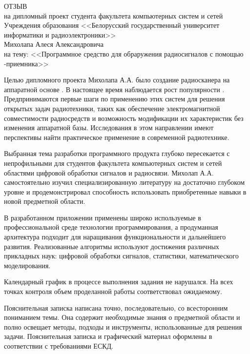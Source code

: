 \thispagestyle{empty}

\begin{singlespace}

{\small
  \begin{center}
    \begin{minipage}{0.8\textwidth}
      \begin{center}
        {\normalsize ОТЗЫВ}\\[1em]
        на дипломный проект студента факультета компьютерных систем и сетей 
        Учреждения образования <<Белорусский государственный университет информатики и радиоэлектроники>>\\
        Михолапа Алеся Александровича \\
        на тему: <<Программное средство для обраружения радиосигналов с помощью \SDR-приемника>>
      \end{center}
    \end{minipage}
  \end{center}

Целью дипломного проекта Михолапа А.А. было создание радиосканера на аппаратной основе \sdr.
В настоящее время наблюдается рост популярности \SDR. Предпринимаются первые шаги по применению этих систем для решения открытых задач радиотехники, таких как обеспечение электромагнитной совместимости радиосредств и возможность модификации их характеристик без изменения аппаратной базы.
Исследования в этом направлении имеют перспективы найти практическое применение в современной радиотехнике.

Выбранная тема разработки программного продукта глубоко пересекается с непрофильными для студентов факультета компьютерных систем и сетей областями цифровой обработки сигналов и радиосвязи. Михолап А.А. самостоятельно изучил специализированную литературу на достаточно глубоком уровне и продемонстрировал способность использовать приобретенные навыки в новой предметной области.

В разработанном приложении применены широко используемые в профессиональной среде технологии программирования, а продуманная архитектура подходит для наращивания функциональности и дальнейшего развития.
Реализованные алгоритмы используют достижения различных прикладных наук: цифровой обработки сигналов, статистики, математического моделирования.

Календарный график в процессе выполнения задания не нарушался. На всех точках контроля объем проделанной работы соответствовал ожидаемому.

Пояснительная записка написана точно, последовательно, со всесторонним пониманием темы. Она содержит необходимые знания о предметной области и полно освещает методы, подходы и инструменты, использованные для решения задачи.
Пояснительная записка и графический материал оформлены в соответствии с требованиями ЕСКД.

}
\end{singlespace}
